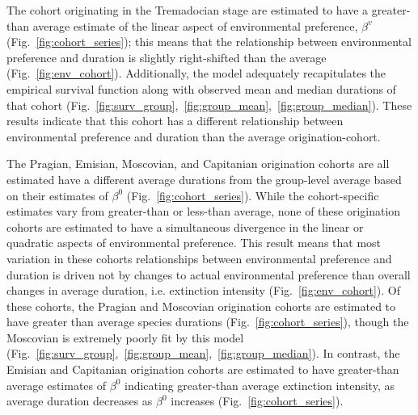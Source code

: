 \documentclass[11pt]{article}
\begin{document}
The cohort originating in the Tremadocian stage are estimated to have a greater-than average estimate of the linear aspect of environmental preference, \(\beta^{v}\) (Fig.~\ref{fig:cohort_series}); this means that the relationship between environmental preference and duration is slightly right-shifted than the average (Fig.~\ref{fig:env_cohort}). Additionally, the model adequately recapitulates the empirical survival function along with observed mean and median durations of that cohort (Fig.~\ref{fig:surv_group},~\ref{fig:group_mean},~\ref{fig:group_median}). These results indicate that this cohort has a different relationship between environmental preference and duration than the average origination-cohort.

The Pragian, Emisian, Moscovian, and Capitanian origination cohorts are all estimated have a different average durations from the group-level average based on their estimates of \(\beta^{0}\) (Fig.~\ref{fig:cohort_series}). While the cohort-specific estimates vary from greater-than or less-than average, none of these origination cohorts are estimated to have a simultaneous divergence in the linear or quadratic aspects of environmental preference. This result means that most variation in these cohorts relationships between environmental preference and duration is driven not by changes to actual environmental preference than overall changes in average duration, i.e. extinction intensity (Fig.~\ref{fig:env_cohort}). Of these cohorts, the Pragian and Moscovian origination cohorts are estimated to have greater than average species durations (Fig.~\ref{fig:cohort_series}), though the Moscovian is extremely poorly fit by this model (Fig.~\ref{fig:surv_group},~\ref{fig:group_mean},~\ref{fig:group_median}). In contrast, the Emisian and Capitanian origination cohorts are estimated to have greater-than average estimates of \(\beta^{0}\) indicating greater-than average extinction intensity, as average duration decreases as \(\beta^{0}\) increases (Fig.~\ref{fig:cohort_series}). 
\end{document}
